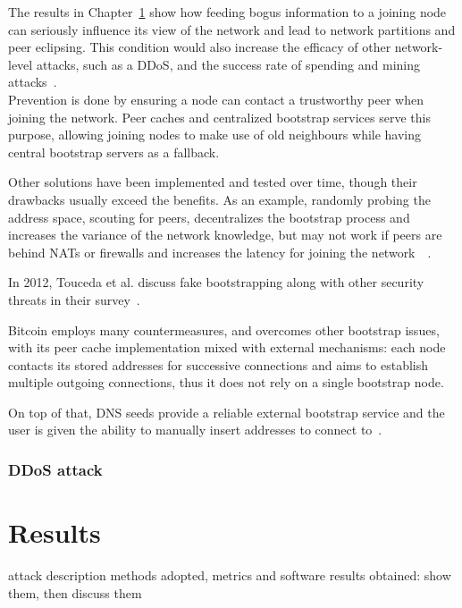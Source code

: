 \documentclass[12pt, letterpaper, twoside]{article}
\begin{document}
The results in Chapter~\ref{sec:res} show how feeding bogus information to a joining node can seriously influence its view of the network and lead to network partitions and peer eclipsing. This condition would also increase the efficacy of other network-level attacks, such as a DDoS, and the success rate of spending and mining attacks~\cite{eclipseatk}.\\

Prevention is done by ensuring a node can contact a trustworthy peer when joining the network. Peer caches and centralized bootstrap services serve this purpose, allowing joining nodes to make use of old neighbours while having central bootstrap servers as a fallback.

Other solutions have been implemented and tested over time, though their drawbacks usually exceed the benefits. As an example, randomly probing the address space, scouting for peers, decentralizes the bootstrap process and increases the variance of the network knowledge, but may not work if peers are behind NATs or firewalls and increases the latency for joining the network~\cite{decentrbootstrapp2p}~\cite{localityaware}.

In 2012,  Touceda et al. discuss fake bootstrapping along with other security threats in their survey~\cite{toucedafakeboot}.

Bitcoin employs many countermeasures, and overcomes other bootstrap issues, with its peer cache implementation mixed with external mechanisms: each node contacts its stored addresses for successive connections and aims to establish multiple outgoing connections, thus it does not rely on a single bootstrap node.

On top of that, DNS seeds provide a reliable external bootstrap service and the user is given the ability to manually insert addresses to connect to~\cite{mahmoud_netsec_boot}.


\subsubsection{DDoS attack}\label{sec:ddos}


\section{Results}\label{sec:res}
attack description
methods adopted, metrics and software
results obtained: show them, then discuss them




















\end{document}
